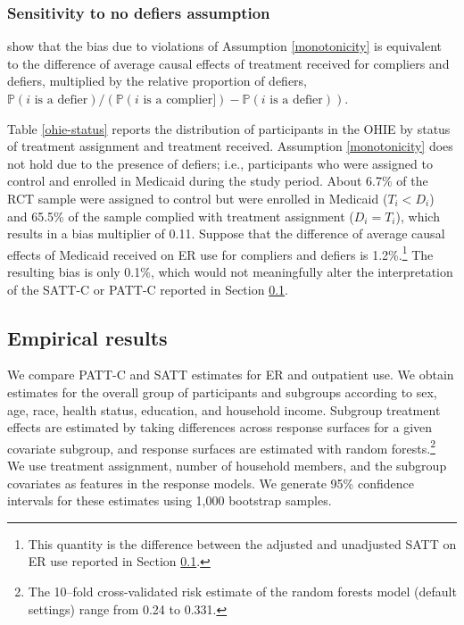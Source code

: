 \documentclass[hidelinks,12pt]{article}
\newcommand{\pr}{\mathbb{P}} %
\begin{document}
{{\color{red}
\subsubsection{Sensitivity to no defiers assumption} \label{sens-defiers}
}

\citet{Angrist1996} show that the bias due to violations of Assumption \ref{monotonicity} is equivalent to the difference of average causal effects of treatment received for compliers and defiers, multiplied by the relative proportion of defiers, 
$\pr(i\text{ is a defier}) / (\pr(i\text{ is a complier]}) - \pr(i\text{ is a defier})).$

Table \ref{ohie-status} reports the distribution of participants in the OHIE by status of treatment assignment and treatment received. Assumption \ref{monotonicity} does not hold due to the presence of defiers; i.e., participants who were assigned to control and enrolled in Medicaid during the study period. About 6.7\% of the RCT sample were assigned to control but were enrolled in Medicaid ($T_i < D_i$) and 65.5\% of the sample complied with treatment assignment ($D_i = T_i$), which results in a bias multiplier of 0.11. Suppose that the difference of average causal effects of Medicaid received on ER use for compliers and defiers is 1.2\%.\footnote{This quantity is the difference between the adjusted and unadjusted SATT on ER use reported in Section \ref{results}.} The resulting bias is only 0.1\%, which would not meaningfully alter the interpretation of the SATT-C or PATT-C reported in Section \ref{results}. 
 
\subsection{Empirical results}\label{results}

We compare PATT-C and SATT estimates for ER and outpatient use. We obtain estimates for the overall group of participants and subgroups according to sex, age, race, health status, education, and household income. Subgroup treatment effects are estimated by taking differences across response surfaces for a given covariate subgroup, and response surfaces are estimated with random forests.\footnote{The 10--fold cross-validated risk estimate of the random forests model (default settings) range from 0.24 to 0.331.} We use treatment assignment, number of household members, and the subgroup covariates as features in the response models. We generate 95\% confidence intervals for these estimates using 1,000 bootstrap samples.%

}
\end{document}
